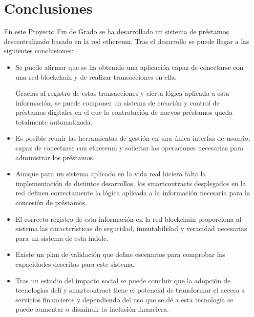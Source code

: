 \chapter{Conclusiones}


En este Proyecto Fin de Grado se ha desarrollado un sistema de préstamos 
descentralizado basado en la red \gls{ethereum}. 
Tras el desarrollo se puede llegar a las siguientes conclusiones:
\begin{itemize}
     \item Se puede afirmar que se ha obtenido 
una aplicación capaz de conectarse con una red \gls{blockchain} y de realizar 
transacciones en ella.

Gracias al registro de estas transacciones y cierta lógica aplicada 
a esta información, se puede componer un sistema de creación y control de préstamos 
digitales en el que la contratación de nuevos préstamos queda totalmente automatizada.

     \item Es posible reunir las herramientas de gestión en una única interfaz
de usuario, capaz de conectarse con \gls{ethereum} y solicitar las operaciones necesarias
para administrar los préstamos.

     \item Aunque para un sistema aplicado en la vida real hiciera falta 
     la implementación de distintos desarrollos, los \glspl{smartcontract} 
     desplegados en la red definen correctamente la lógica 
     aplicada a la información necesaria para la concesión de préstamos.

     \item El correcto registro de esta información en la red \gls{blockchain} 
     proporciona al sistema las características de seguridad, inmutabilidad y 
     veracidad necesarias para un sistema de esta índole.

     \item Existe un plan de validación que define escenarios para comprobar las capacidades descritas
     para este sistema.

     \item Tras un estudio del impacto social se puede concluir que la adopción 
     de tecnologías \gls{defi} y \gls{smartcontract} tiene el potencial de transformar
     el acceso a servicios financieros y dependiendo del uso que se dé a esta
     tecnología se puede aumentar o disminuir la inclusión financiera.
\end{itemize}




